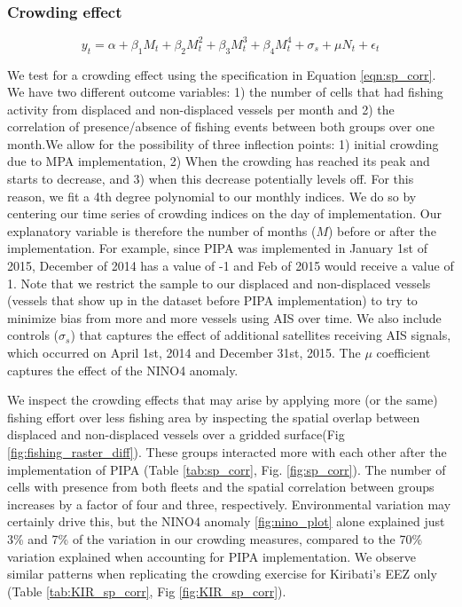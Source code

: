 \documentclass[12pt]{article}
\begin{document}
\subsubsection{Crowding effect}

$$
y_t = \alpha + \beta_1 M_t + \beta_2 M_t^2 + \beta_3 M_t^3 + \beta_4 M_t ^4 + \sigma_s + \mu N_t + \epsilon_t
\label{eqn:sp_corr}
$$

We test for a crowding effect using the specification in Equation \ref{eqn:sp_corr}. We have two different outcome variables:
1) the number of cells that had fishing activity from displaced and non-displaced vessels per month and 2) the correlation of presence/absence of fishing events between both groups over one month.We allow for the possibility of three inflection points: 1) initial crowding due to MPA implementation, 2) When the crowding has reached its peak and starts to decrease, and 3) when this decrease potentially levels off. For this reason, we fit a 4th degree polynomial to our monthly indices. We do so by centering our time series of crowding indices on the day of implementation. Our explanatory variable is therefore the number of months ($M$) before or after the implementation. For example, since PIPA was implemented in January 1st of 2015, December of 2014 has a value of -1 and Feb of 2015 would receive a value of 1. Note that we restrict the sample to our displaced and non-displaced vessels (vessels that show up in the dataset before PIPA implementation) to try to minimize bias from more and more vessels using AIS over time. We also include controls ($\sigma_s$) that captures the effect of additional satellites receiving AIS signals, which occurred on April 1st, 2014 and December 31st, 2015. The $\mu$ coefficient captures the effect of the NINO4 anomaly.

We inspect the crowding effects that may arise by applying more (or the same) fishing effort over less fishing area by inspecting the spatial overlap between displaced and non-displaced vessels over a gridded surface(Fig \ref{fig:fishing_raster_diff}). These groups interacted more with each other after the implementation of PIPA (Table \ref{tab:sp_corr}, Fig. \ref{fig:sp_corr}). The number of cells with presence from both fleets and the spatial correlation between groups increases by a factor of four and three, respectively. Environmental variation may certainly drive this, but the NINO4 anomaly \ref{fig:nino_plot} alone explained just 3\% and 7\% of the variation in our crowding measures, compared to the 70\% variation explained when accounting for PIPA implementation. We observe similar patterns when replicating the crowding exercise for Kiribati's EEZ only (Table \ref{tab:KIR_sp_corr}, Fig \ref{fig:KIR_sp_corr}).
\end{document}
